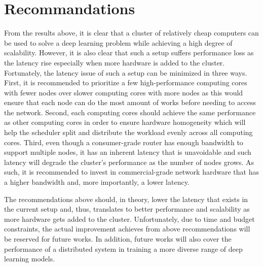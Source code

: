 \documentclass[conference]{IEEEtran}
\begin{document}
    \section{Recommandations}
        From the results above, it is clear that a cluster of relatively cheap computers can be used to solve a deep learning problem while achieving a high degree of scalability. However, it is also clear that such a setup suffers performance loss as the latency rise especially when more hardware is added to the cluster. Fortunately, the latency issue of such a setup can be minimized in three ways. First, it is recommended to prioritize a few high-performance computing cores with fewer nodes over slower computing cores with more nodes as this would ensure that each node can do the most amount of works before needing to access the network. Second, each computing cores should achieve the same performance as other computing cores in order to ensure hardware homogeneity which will help the scheduler split and distribute the workload evenly across all computing cores. Third, even though a consumer-grade router has enough bandwidth to support multiple nodes, it has an inherent latency that is unavoidable and such latency will degrade the cluster's performance as the number of nodes grows. As such, it is recommended to invest in commercial-grade network hardware that has a higher bandwidth and, more importantly, a lower latency. 
            
        The recommendations above should, in theory, lower the latency that exists in the current setup and, thus, translates to better performance and scalability as more hardware gets added to the cluster. Unfortunately, due to time and budget constraints, the actual improvement achieves from above recommendations will be reserved for future works. In addition, future works will also cover the performance of a distributed system in training a more diverse range of deep learning models. 
        
        \nocite{*}

    
    
    
\end{document}
